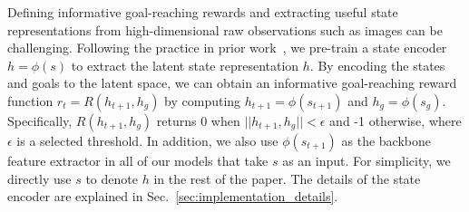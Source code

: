 Defining informative goal-reaching rewards and extracting useful state representations from high-dimensional raw observations such as images can be challenging. Following the practice in prior work~\cite{nair2018rig, Khazatsky2021WhatCI}, we pre-train a state encoder $h=\phi(s)$ to extract the latent state representation $h$. By encoding the states and goals to the latent space, we can obtain an informative goal-reaching reward function $r_t = R(h_{t+1}, h_g)$ by computing $h_{t+1} = \phi(s_{t+1})$ and $h_g = \phi(s_g)$. Specifically, $R(h_{t+1}, h_g)$ returns 0 when $||h_{t+1}, h_g || < \epsilon$ and -1 otherwise, where $\epsilon$ is a selected threshold. In addition, we also use $\phi(s_{t+1})$ as the backbone feature extractor in all of our models that take $s$ as an input. For simplicity, we directly use $s$ to denote $h$ in the rest of the paper. The details of the state encoder are explained in Sec.~\ref{sec:implementation_details}.




